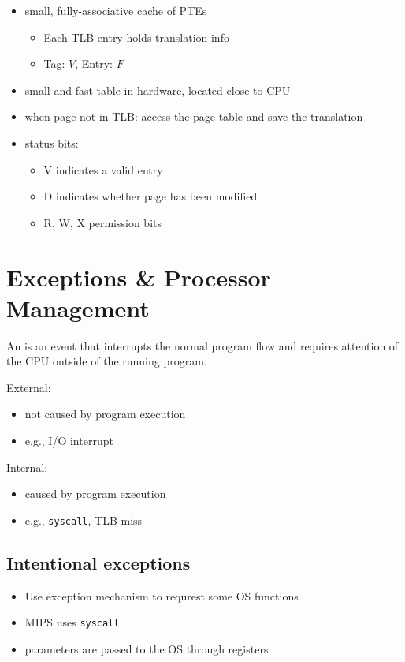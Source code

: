 \documentclass{article}
\newcommand{\T}[1]{\texttt{#1}}
\begin{document}
\begin{itemize}
	\item small, fully-associative cache of PTEs \begin{itemize}
		\item Each TLB entry holds translation info
		\item Tag: $V$, Entry: $F$
	\end{itemize}
	\item small and fast table in hardware, located close to CPU
	\item when page not in TLB: access the page table and save the translation
	\item status bits: \begin{itemize}
		\item V indicates a valid entry
		\item D indicates whether page has been modified
		\item R, W, X permission bits
	\end{itemize} 
\end{itemize}

\section{Exceptions \& Processor Management}

\begin{definition}
	An  is an event that interrupts the normal program flow
	and requires attention of the CPU outside of the running program.
\end{definition}

External:
\begin{itemize}
	\item not caused by program execution
	\item e.g., I/O interrupt
\end{itemize}

Internal:
\begin{itemize}
	\item caused by program execution
	\item e.g., \T{syscall}, TLB miss
\end{itemize}

\subsection{Intentional exceptions}

\begin{itemize}
	\item Use exception mechanism to requrest some OS functions
	\item MIPS uses \T{syscall}
	\item parameters are passed to the OS through registers
\end{itemize}
\end{document}
